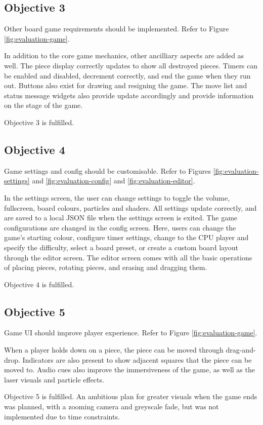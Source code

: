 \documentclass[../main/main.tex]{subfiles}
\begin{document}
\subsection{Objective 3}
Other board game requirements should be implemented. Refer to Figure \ref{fig:evaluation-game}.

In addition to the core game mechanics, other ancilliary aspects are added as well. The piece display correctly updates to show all destroyed pieces. Timers can be enabled and disabled, decrement correctly, and end the game when they run out. Buttons also exist for drawing and resigning the game. The move list and status message widgets also provide update accordingly and provide information on the stage of the game.

Objective 3 is fulfilled.

\subsection{Objective 4}
Game settings and config should be customisable. Refer to Figures \ref{fig:evaluation-settings} and \ref{fig:evaluation-config} and \ref{fig:evaluation-editor}.

In the settings screen, the user can change settings to toggle the volume, fullscreen, board colours, particles and shaders. All settings update correctly, and are saved to a local JSON file when the settings screen is exited. The game configurations are changed in the config screen. Here, users can change the game's starting colour, configure timer settings, change to the CPU player and specify the difficulty, select a board preset, or create a custom board layout through the editor screen. The editor screen comes with all the basic operations of placing pieces, rotating pieces, and erasing and dragging them.

Objective 4 is fulfilled.

\subsection{Objective 5}
Game UI should improve player experience. Refer to Figure \ref{fig:evaluation-game}.

When a player holds down on a piece, the piece can be moved through drag-and-drop. Indicators are also present to show adjacent squares that the piece can be moved to. Audio cues also improve the immersiveness of the game, as well as the laser visuals and particle effects.

Objective 5 is fulfilled. An ambitious plan for greater visuals when the game ends was planned, with a zooming camera and greyscale fade, but was not implemented due to time constraints.
\end{document}
